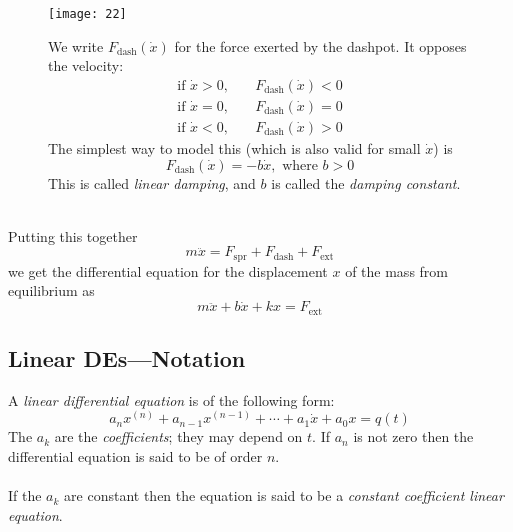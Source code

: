 \documentclass{report}
\begin{document}
\begin{figure}[h]
\begin{center}
\texttt{[image: 22]}\\
\end{center}
We write $F_\text{dash}(\dot{x})$ for the force exerted by the dashpot. It opposes the velocity:
\begin{align*}
\text{if }\dot{x}>0,\quad&F_\text{dash}(\dot{x})<0\\
\text{if }\dot{x}=0,\quad&F_\text{dash}(\dot{x})=0\\
\text{if }\dot{x}<0,\quad&F_\text{dash}(\dot{x})>0
\end{align*}
The simplest way to model this (which is also valid for small $\dot{x}$) is
\begin{equation*}
F_\text{dash}(\dot{x})=-b\dot{x},\text{ where }b>0
\end{equation*}
This is called \textit{linear damping}, and $b$ is called the \textit{damping constant}.
\end{figure}\\
Putting this together
\begin{equation*}
m\ddot{x}=F_\text{spr}+F_\text{dash}+F_\text{ext}
\end{equation*}
we get the differential equation for the displacement $x$ of the mass from equilibrium as
\begin{equation*}
m\ddot{x}+b\dot{x}+kx=F_\text{ext}
\end{equation*}
\newpage

\subsection{Linear DEs---Notation}
A \textit{linear differential equation} is of the following form:
\begin{equation*}
a_nx^{(n)}+a_{n-1}x^{(n-1)}+\cdots+a_1\dot{x}+a_0x=q(t)
\end{equation*}
The $a_k$ are the \textit{coefficients}; they may depend on $t$. If $a_n$ is not
zero then the differential equation is said to be of order $n$.\\
\vspace{1mm}\\
If the $a_k$ are constant then the equation is said to be a \textit{constant coefficient linear equation}.
\end{document}
